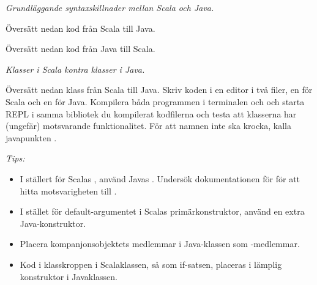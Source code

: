 

\Exercise{\ExeWeekELEVEN}\label{exe:W11}

\begin{Goals}
\item \TODO
\end{Goals}

\begin{Preparations}
\item {} 
\end{Preparations}

\BasicTasks %

\TODO

\Task \emph{Grundläggande syntaxskillnader mellan Scala och Java.} 

\Subtask Översätt nedan kod från Scala till Java.
\TODO
\begin{Code}

\end{Code}

\Subtask Översätt nedan kod från Java till Scala.
\TODO
\begin{Code}

\end{Code}



\Task \emph{Klasser i Scala kontra klasser i Java.}  

\Subtask Översätt nedan klass från Scala till Java. Skriv koden i en editor i två filer, en för Scala och en för Java. Kompilera båda programmen i terminalen och och starta REPL i samma bibliotek du kompilerat kodfilerna och testa att klasserna har (ungefär) motsvarande funktionalitet. För att namnen inte ska krocka, kalla javapunkten . 

\emph{Tips:}
\begin{itemize}[nolistsep, noitemsep]
\item  I ställert för Scalas , använd Javas . Undersök dokumentationen för  för att hitta motsvarigheten till .
\item I stället för default-argumentet i Scalas primärkonstruktor, använd en extra Java-konstruktor. 
\item Placera kompanjonsobjektets medlemmar i Java-klassen som -medlemmar.
\item Kod i klasskroppen i Scalaklassen, så som if-satsen, placeras i lämplig konstruktor i Javaklassen.
\end{itemize}

